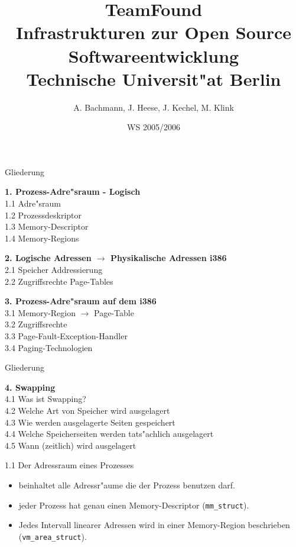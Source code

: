 \documentclass[landscape]{slides}
\begin{document}
%
\title{TeamFound\\Infrastrukturen zur Open Source Softwareentwicklung\\Technische Universit"at Berlin}
\author{A. Bachmann, J. Heese, J. Kechel, M. Klink}
\date{WS 2005/2006}

%
\maketitle%
%
\begin{slide}{Gliederung}

\textbf{1. Prozess-Adre"sraum - Logisch}\\
1.1 Adre"sraum\\
1.2 Prozessdeskriptor\\
1.3 Memory-Descriptor\\
1.4 Memory-Regions

\textbf{2. Logische Adressen $\to$ Physikalische Adressen i386}\\
2.1 Speicher Addressierung\\
2.2 Zugriffsrechte Page-Tables

\textbf{3. Prozess-Adre"sraum auf dem i386}\\
3.1 Memory-Region $\to$ Page-Table\\
3.2 Zugriffsrechte\\
3.3 Page-Fault-Exception-Handler\\
3.4 Paging-Technologien
\end{slide}
%
\begin{slide}{Gliederung}

\textbf{4. Swapping}\\
4.1 Was ist Swapping?\\
4.2 Welche Art von Speicher wird ausgelagert\\
4.3 Wie werden ausgelagerte Seiten gespeichert\\
4.4 Welche Speicherseiten werden tats"achlich ausgelagert\\
4.5 Wann (zeitlich) wird ausgelagert
\end{slide}
%
%
%
\begin{slide}{1.1 Der Adressraum eines Prozesses}
\begin{itemize}
\item beinhaltet alle Adressr"aume die der Prozess benutzen darf.
\item jeder Prozess hat genau einen Memory-Descriptor (\texttt{mm\_struct}).
\item Jedes Intervall linearer Adressen wird in einer Memory-Region beschrieben (\texttt{vm\_area\_struct}).
\end{itemize}
\end{slide}
\end{document}
